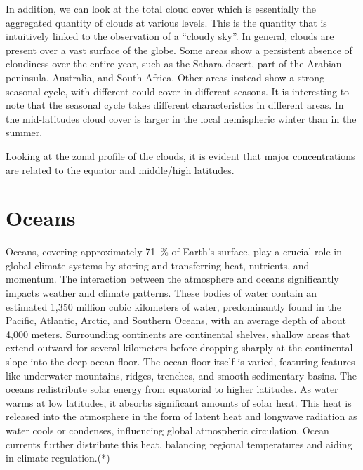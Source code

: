 In addition, we can look at the total cloud cover which is essentially the aggregated quantity of clouds at various levels. This is the quantity that is intuitively linked to the observation of a “cloudy sky”. In general, clouds are present over a vast surface of the globe. Some areas show a persistent absence of cloudiness over the entire year, such as the Sahara desert, part of the Arabian peninsula, Australia, and South Africa. Other areas instead show a strong seasonal cycle, with different could cover in different seasons. It is interesting to note that the seasonal cycle takes different characteristics in different areas. In the mid-latitudes cloud cover is larger in the local hemispheric winter than in the summer.

Looking at the zonal profile of the clouds, it is evident that major concentrations are related to the equator and middle/high latitudes.



\section{Oceans}
Oceans, covering approximately \qty{71}{\percent} of Earth's surface, play a crucial role in global climate systems by storing and transferring heat, nutrients, and momentum. The interaction between the atmosphere and oceans significantly impacts weather and climate patterns. These bodies of water contain an estimated 1,350 million cubic kilometers of water, predominantly found in the Pacific, Atlantic, Arctic, and Southern Oceans, with an average depth of about 4,000 meters.
\newline Surrounding continents are continental shelves, shallow areas that extend outward for several kilometers before dropping sharply at the continental slope into the deep ocean floor. The ocean floor itself is varied, featuring features like underwater mountains, ridges, trenches, and smooth sedimentary basins.
\newline The oceans redistribute solar energy from equatorial to higher latitudes. As water warms at low latitudes, it absorbs significant amounts of solar heat. This heat is released into the atmosphere in the form of latent heat and longwave radiation as water cools or condenses, influencing global atmospheric circulation. Ocean currents further distribute this heat, balancing regional temperatures and aiding in climate regulation.(*)

